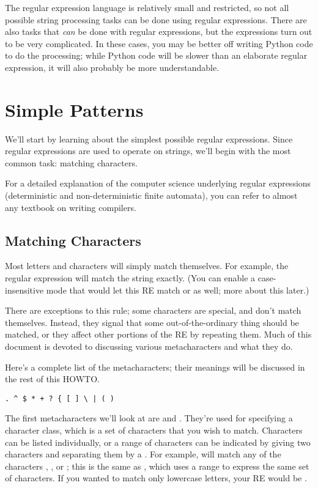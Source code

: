 \documentclass{howto}
\begin{document}
The regular expression language is relatively small and restricted, so
not all possible string processing tasks can be done using regular
expressions.  There are also tasks that \emph{can} be done with
regular expressions, but the expressions turn out to be very
complicated.  In these cases, you may be better off writing Python
code to do the processing; while Python code will be slower than an
elaborate regular expression, it will also probably be more understandable.

\section{Simple Patterns}

We'll start by learning about the simplest possible regular
expressions.  Since regular expressions are used to operate on
strings, we'll begin with the most common task: matching characters.

For a detailed explanation of the computer science underlying regular
expressions (deterministic and non-deterministic finite automata), you
can refer to almost any textbook on writing compilers.

\subsection{Matching Characters}

Most letters and characters will simply match themselves.  For
example, the regular expression  will match the string
 exactly.  (You can enable a case-insensitive mode that
would let this RE match  or  as well; more
about this later.)  

There are exceptions to this rule; some characters are
special, and don't match themselves.  Instead, they signal that some
out-of-the-ordinary thing should be matched, or they affect other
portions of the RE by repeating them.  Much of this document is
devoted to discussing various metacharacters and what they do.

Here's a complete list of the metacharacters; their meanings will be
discussed in the rest of this HOWTO.

\begin{verbatim}
. ^ $ * + ? { [ ] \ | ( )
\end{verbatim}

The first metacharacters we'll look at are \samp{[} and \samp{]}.
They're used for specifying a character class, which is a set of
characters that you wish to match.  Characters can be listed
individually, or a range of characters can be indicated by giving two
characters and separating them by a \character{-}.  For example,
\regexp{[abc]} will match any of the characters , , or
; this is the same as
\regexp{[a-c]}, which uses a range to express the same set of
characters.  If you wanted to match only lowercase letters, your
RE would be \regexp{[a-z]}.
\end{document}
